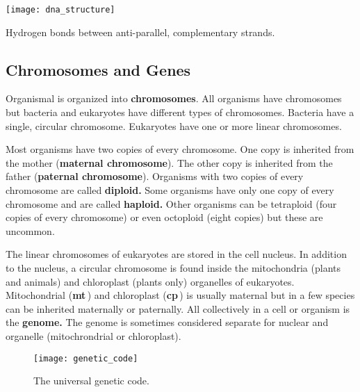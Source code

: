 \documentclass[letterpaper]{tufte-handout}
\begin{document}
\begin{marginfigure}
\texttt{[image: dna\_structure]}
\caption{Hydrogen bonds between anti-parallel, complementary strands.}\label{fig:dna_structure}
\end{marginfigure}

\subsection*{Chromosomes and Genes}

Organismal  is organized into \textbf{chromosomes}. All organisms have chromosomes but bacteria and eukaryotes have different types of chromosomes. Bacteria have a single, circular chromosome. Eukaryotes have one or more linear chromosomes.

Most organisms have two copies of every chromosome. One copy is inherited from the mother (\textbf{maternal chromosome}). The other copy is inherited from the father (\textbf{paternal chromosome}). Organisms with two copies of every chromosome are called \textbf{diploid.} Some organisms have only one copy of every chromosome and are called \textbf{haploid.} Other organisms can be tetraploid (four copies of every chromosome) or even octoploid (eight copies) but these are uncommon.

The linear chromosomes of eukaryotes are stored in the cell nucleus. In addition to the nucleus, a circular chromosome is found inside the mitochondria (plants and animals) and chloroplast (plants only) organelles of eukaryotes. Mitochondrial  (\textbf{mt\,}) and chloroplast  (\textbf{cp\,}) is usually maternal but in a few species can be inherited maternally or paternally. All  collectively in a cell or organism is the \textbf{genome.} The genome is sometimes considered separate for nuclear  and organelle  (mitochrondrial or chloroplast).

\begin{figure}
\texttt{[image: genetic\_code]}
\caption{The universal genetic code.}\label{fig:genetic_code}
\end{figure}
\end{document}

